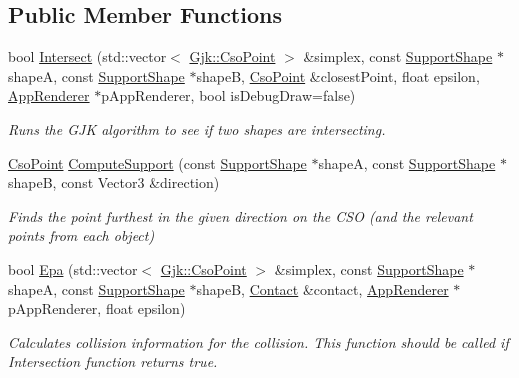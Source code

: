 \subsection*{Public Member Functions}
\begin{DoxyCompactItemize}
\item 
bool \hyperlink{classGjk_af73bc5ca3bab4249ff1fa648d8bef8fd}{Intersect} (std\+::vector$<$ \hyperlink{structGjk_1_1CsoPoint}{Gjk\+::\+Cso\+Point} $>$ \&simplex, const \hyperlink{classSupportShape}{Support\+Shape} $\ast$shapeA, const \hyperlink{classSupportShape}{Support\+Shape} $\ast$shapeB, \hyperlink{structGjk_1_1CsoPoint}{Cso\+Point} \&closest\+Point, float epsilon, \hyperlink{classAppRenderer}{App\+Renderer} $\ast$p\+App\+Renderer, bool is\+Debug\+Draw=false)
\begin{DoxyCompactList}\small\item\em Runs the G\+JK algorithm to see if two shapes are intersecting. \end{DoxyCompactList}\item 
\hyperlink{structGjk_1_1CsoPoint}{Cso\+Point} \hyperlink{classGjk_a5d71f197f9410cb4fcd39f75dbf76d05}{Compute\+Support} (const \hyperlink{classSupportShape}{Support\+Shape} $\ast$shapeA, const \hyperlink{classSupportShape}{Support\+Shape} $\ast$shapeB, const Vector3 \&direction)
\begin{DoxyCompactList}\small\item\em Finds the point furthest in the given direction on the C\+SO (and the relevant points from each object) \end{DoxyCompactList}\item 
bool \hyperlink{classGjk_a6dde80e2d8016f11750cabf5072e5bd8}{Epa} (std\+::vector$<$ \hyperlink{structGjk_1_1CsoPoint}{Gjk\+::\+Cso\+Point} $>$ \&simplex, const \hyperlink{classSupportShape}{Support\+Shape} $\ast$shapeA, const \hyperlink{classSupportShape}{Support\+Shape} $\ast$shapeB, \hyperlink{classContact}{Contact} \&contact, \hyperlink{classAppRenderer}{App\+Renderer} $\ast$p\+App\+Renderer, float epsilon)
\begin{DoxyCompactList}\small\item\em Calculates collision information for the collision. This function should be called if Intersection function returns true. \end{DoxyCompactList}\end{DoxyCompactItemize}
